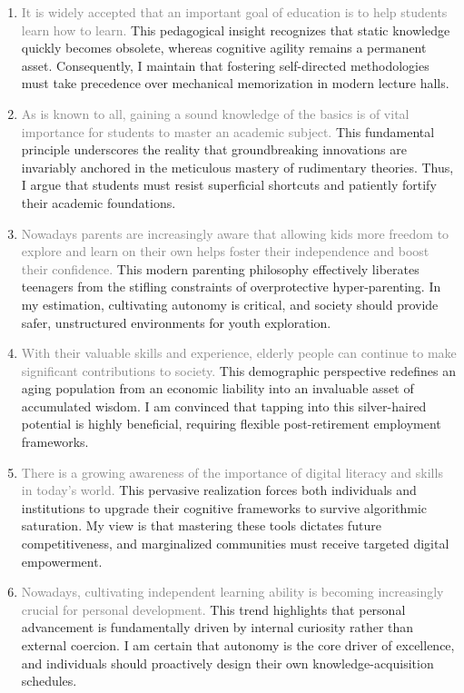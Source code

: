 ﻿\documentclass[lang=cn,11pt]{elegantbook}
\begin{document}
\begin{enumerate}
    \item \textcolor{gray}{It is widely accepted that an important goal of education is to help students learn how to learn.} This pedagogical insight recognizes that static knowledge quickly becomes obsolete, whereas cognitive agility remains a permanent asset. Consequently, I maintain that fostering self-directed methodologies must take precedence over mechanical memorization in modern lecture halls.
    \item \textcolor{gray}{As is known to all, gaining a sound knowledge of the basics is of vital importance for students to master an academic subject.} This fundamental principle underscores the reality that groundbreaking innovations are invariably anchored in the meticulous mastery of rudimentary theories. Thus, I argue that students must resist superficial shortcuts and patiently fortify their academic foundations.
    \item \textcolor{gray}{Nowadays parents are increasingly aware that allowing kids more freedom to explore and learn on their own helps foster their independence and boost their confidence.} This modern parenting philosophy effectively liberates teenagers from the stifling constraints of overprotective hyper-parenting. In my estimation, cultivating autonomy is critical, and society should provide safer, unstructured environments for youth exploration.
    \item \textcolor{gray}{With their valuable skills and experience, elderly people can continue to make significant contributions to society.} This demographic perspective redefines an aging population from an economic liability into an invaluable asset of accumulated wisdom. I am convinced that tapping into this silver-haired potential is highly beneficial, requiring flexible post-retirement employment frameworks.
    \item \textcolor{gray}{There is a growing awareness of the importance of digital literacy and skills in today's world.} This pervasive realization forces both individuals and institutions to upgrade their cognitive frameworks to survive algorithmic saturation. My view is that mastering these tools dictates future competitiveness, and marginalized communities must receive targeted digital empowerment.
    \item \textcolor{gray}{Nowadays, cultivating independent learning ability is becoming increasingly crucial for personal development.} This trend highlights that personal advancement is fundamentally driven by internal curiosity rather than external coercion. I am certain that autonomy is the core driver of excellence, and individuals should proactively design their own knowledge-acquisition schedules.

\end{enumerate}
\end{document}
